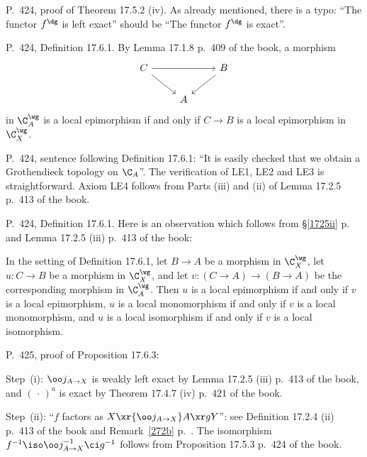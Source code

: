 \documentclass[12pt]{article}
\theoremstyle{remark}
\theoremstyle{definition}
\begin{document}
%

\begin{s} 
P.~424, proof of Theorem 17.5.2 (iv). As already mentioned, there is a typo: ``The functor $f^\dg$ is left exact'' should be ``The functor $f^\dg$ is exact''. 
\end{s}

%

\begin{s}
P.~424, Definition 17.6.1. By Lemma 17.1.8 p.~409 of the book, a morphism 
$$
\begin{tikzcd} 
C\ar{rr}\ar{dr}&&B\ar{dl}\\ 
{}&A
\end{tikzcd}
$$ 
in $\C_A^\wg$ is a local epimorphism if and only if $C\to B$ is a local epimorphism in $\C_X^\wg$.
\end{s}

%

\begin{s}
P.~424, sentence following Definition 17.6.1: ``It is easily checked that we obtain a Grothendieck topology on $\C_A$''. The verification  of LE1, LE2 and LE3 is straightforward. Axiom LE4 follows from Parts (iii) and (ii) of Lemma 17.2.5 p.~413 of the book.
\end{s} 

%

\begin{s} 
P.~424, Definition 17.6.1. Here is an observation which follows from \S\ref{1725ii} p.~ and Lemma 17.2.5 (iii) p.~413 of the book: 

In the setting of Definition 17.6.1, let $B\to A$ be a morphism in $\C_X^\wg$, let $u:C\to B$ be a morphism in $\C_X^\wg$, and let $v:(C\to A)\to(B\to A)$ be the corresponding morphism in $\C_A^\wg$. Then $u$ is a local epimorphism if and only if $v$ is a local epimorphism, $u$ is a local monomorphism if and only if $v$ is a local monomorphism, and $u$ is a local isomorphism if and only if $v$ is a local isomorphism. 
\end{s} 

%

\begin{s}
P.~425, proof of Proposition 17.6.3: 

Step~(i): $\oo j_{A\to X}$ is weakly left exact by Lemma 17.2.5 (iii) p.~413 of the book, and $(\,\cdot\,)^a$ is exact by Theorem 17.4.7 (iv) p.~421 of the book.

Step~(ii): ``$f$ factors as $X\xr{\oo j_{A\to X}}A\xr gY$'': see Definition 17.2.4 (ii) p.~413 of the book and Remark~\ref{272b} p.~. The isomorphism $f^{-1}\iso\oo j_{A\to X}^{-1}\ci g^{-1}$ follows from Proposition 17.5.3 p.~424 of the book.
\end{s} 
\end{document}
